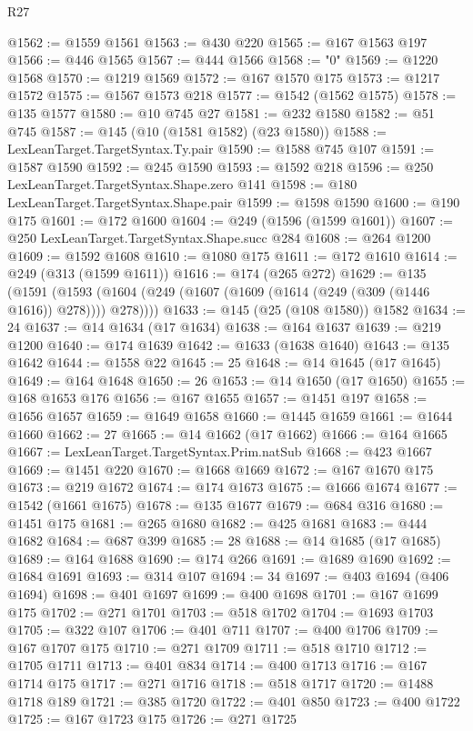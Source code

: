 \begin{lexlean}{R27}
\begin{coremodule}
@1562 := @1559 @1561
@1563 := @430 @220
@1565 := @167 @1563 @197
@1566 := @446 @1565
@1567 := @444 @1566
@1568 := "0"
@1569 := @1220 @1568
@1570 := @1219 @1569
@1572 := @167 @1570 @175
@1573 := @1217 @1572
@1575 := @1567 @1573 @218
@1577 := @1542 (@1562 @1575)
@1578 := @135 @1577
@1580 := @10 @745 @27
@1581 := @232 @1580
@1582 := @51 @745
@1587 := @145 (@10 (@1581 @1582) (@23 @1580))
@1588 := LexLeanTarget.TargetSyntax.Ty.pair
@1590 := @1588 @745 @107
@1591 := @1587 @1590
@1592 := @245 @1590
@1593 := @1592 @218
@1596 := @250 LexLeanTarget.TargetSyntax.Shape.zero @141
@1598 := @180 LexLeanTarget.TargetSyntax.Shape.pair
@1599 := @1598 @1590
@1600 := @190 @175
@1601 := @172 @1600
@1604 := @249 (@1596 (@1599 @1601))
@1607 := @250 LexLeanTarget.TargetSyntax.Shape.succ @284
@1608 := @264 @1200
@1609 := @1592 @1608
@1610 := @1080 @175
@1611 := @172 @1610
@1614 := @249 (@313 (@1599 @1611))
@1616 := @174 (@265 @272)
@1629 := @135
    (@1591 (@1593 (@1604 (@249 (@1607 (@1609 (@1614 (@249 (@309 (@1446 @1616)) @278)))) @278))))
@1633 := @145 (@25 (@108 @1580)) @1582
@1634 := 24
@1637 := @14 @1634 (@17 @1634)
@1638 := @164 @1637
@1639 := @219 @1200
@1640 := @174 @1639
@1642 := @1633 (@1638 @1640)
@1643 := @135 @1642
@1644 := @1558 @22
@1645 := 25
@1648 := @14 @1645 (@17 @1645)
@1649 := @164 @1648
@1650 := 26
@1653 := @14 @1650 (@17 @1650)
@1655 := @168 @1653 @176
@1656 := @167 @1655
@1657 := @1451 @197
@1658 := @1656 @1657
@1659 := @1649 @1658
@1660 := @1445 @1659
@1661 := @1644 @1660
@1662 := 27
@1665 := @14 @1662 (@17 @1662)
@1666 := @164 @1665
@1667 := LexLeanTarget.TargetSyntax.Prim.natSub
@1668 := @423 @1667
@1669 := @1451 @220
@1670 := @1668 @1669
@1672 := @167 @1670 @175
@1673 := @219 @1672
@1674 := @174 @1673
@1675 := @1666 @1674
@1677 := @1542 (@1661 @1675)
@1678 := @135 @1677
@1679 := @684 @316
@1680 := @1451 @175
@1681 := @265 @1680
@1682 := @425 @1681
@1683 := @444 @1682
@1684 := @687 @399
@1685 := 28
@1688 := @14 @1685 (@17 @1685)
@1689 := @164 @1688
@1690 := @174 @266
@1691 := @1689 @1690
@1692 := @1684 @1691
@1693 := @314 @107
@1694 := 34
@1697 := @403 @1694 (@406 @1694)
@1698 := @401 @1697
@1699 := @400 @1698
@1701 := @167 @1699 @175
@1702 := @271 @1701
@1703 := @518 @1702
@1704 := @1693 @1703
@1705 := @322 @107
@1706 := @401 @711
@1707 := @400 @1706
@1709 := @167 @1707 @175
@1710 := @271 @1709
@1711 := @518 @1710
@1712 := @1705 @1711
@1713 := @401 @834
@1714 := @400 @1713
@1716 := @167 @1714 @175
@1717 := @271 @1716
@1718 := @518 @1717
@1720 := @1488 @1718 @189
@1721 := @385 @1720
@1722 := @401 @850
@1723 := @400 @1722
@1725 := @167 @1723 @175
@1726 := @271 @1725

\end{coremodule}
\end{lexlean}
